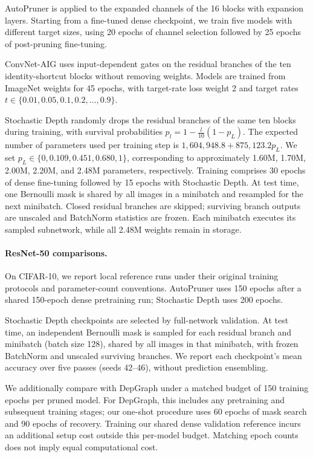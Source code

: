 \documentclass[sigplan,screen]{acmart}
\begin{document}
AutoPruner is applied to the expanded channels of the 16 blocks with
expansion layers. Starting from a fine-tuned dense checkpoint, we train
five models with different target sizes, using 20 epochs of channel
selection followed by 25 epochs of post-pruning fine-tuning.

ConvNet-AIG uses input-dependent gates on the residual branches of the
ten identity-shortcut blocks without removing weights. Models are trained
from ImageNet weights for 45 epochs, with target-rate loss weight 2 and
target rates $t\in\{0.01,0.05,0.1,0.2,\ldots,0.9\}$.

Stochastic Depth randomly drops the residual branches of the same ten
blocks during training, with survival probabilities
$p_l=1-\frac{l}{10}(1-p_L)$. The expected number of parameters used per
training step is $1{,}604{,}948.8+875{,}123.2p_L$. We set
$p_L\in\{0,0.109,0.451,0.680,1\}$, corresponding to approximately
1.60M, 1.70M, 2.00M, 2.20M, and 2.48M parameters, respectively.
Training comprises 30 epochs of dense fine-tuning followed by 15 epochs
with Stochastic Depth. At test time, one Bernoulli mask is shared by all
images in a minibatch and resampled for the next minibatch. Closed
residual branches are skipped; surviving branch outputs are unscaled
and BatchNorm statistics are frozen. Each minibatch executes its sampled
subnetwork, while all 2.48M weights remain in storage.

\paragraph{ResNet-50 comparisons.}
On CIFAR-10, we report local reference runs under their original training
protocols and parameter-count conventions. AutoPruner uses 150 epochs
after a shared 150-epoch dense pretraining run; Stochastic Depth uses
200 epochs.

Stochastic Depth checkpoints are selected by full-network validation.
At test time, an independent Bernoulli mask is sampled for each residual
branch and minibatch (batch size 128), shared by all images in that
minibatch, with frozen BatchNorm and unscaled surviving branches.
We report each checkpoint's mean accuracy over five
passes (seeds 42--46), without prediction ensembling.

We additionally compare with DepGraph under a matched budget of 150
training epochs per pruned model. For DepGraph, this includes any
pretraining and subsequent training stages; our one-shot procedure uses
60 epochs of mask search and 90 epochs of recovery. Training our shared
dense validation reference incurs an additional setup cost outside this
per-model budget. Matching epoch counts does not imply equal
computational cost.
\end{document}
